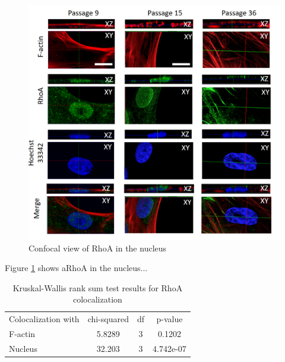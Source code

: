 \documentclass[english,authoryear]{elsarticle}
\begin{document}
\begin{figure}
  \includegraphics[width=0.9\linewidth]{fig_rho-3d.png}
  \caption{Confocal view of RhoA in the nucleus}
  \label{rho-3d}
  \centering
\end{figure}


Figure \ref{rho-3d} shows aRhoA in the nucleus...

\begin{table}
  \caption{Kruskal-Wallis rank sum test results for RhoA colocalization}
  \label{tab2}
\centering
\begin{tabular}{l|ccc}
 Colocalization with & chi-squared & df & p-value  \\
 F-actin & 5.8289 & 3 & 0.1202 \\
 Nucleus & 32.203 & 3 &  4.742e-07

\end{tabular}
\end{table}
\end{document}
